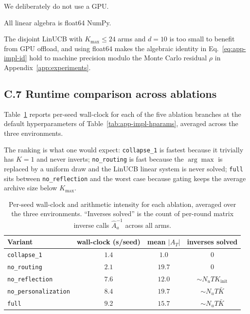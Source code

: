 \documentclass{article} %
\begin{document}
We deliberately do not use a GPU.

All linear algebra is float64 NumPy.

The disjoint LinUCB with $K_{\max} \le 24$ arms and $d = 10$ is too small to benefit from GPU offload, and using float64 makes the algebraic identity in Eq.~\eqref{eq:app-impl-id} hold to machine precision modulo the Monte Carlo residual $\rho$ in Appendix~\ref{app:experiments}.

\subsection{C.7 Runtime comparison across ablations}

\label{app:impl-runtime}

Table~\ref{tab:app-impl-runtime} reports per-seed wall-clock for each of the five ablation branches at the default hyperparameters of Table~\ref{tab:app-impl-hparams}, averaged across the three environments.

The ranking is what one would expect: \texttt{collapse\_1} is fastest because it trivially has $K=1$ and never inverts; \texttt{no\_routing} is fast because the $\arg\max$ is replaced by a uniform draw and the LinUCB linear system is never solved; \texttt{full} sits between \texttt{no\_reflection} and the worst case because gating keeps the average archive size below $K_{\max}$.

\begin{table}[h]
\centering
\small
\begin{tabular}{lccc}
\toprule
Variant & wall-clock (s/seed) & mean $|A_T|$ & inverses solved \\
\midrule
\texttt{collapse\_1}        & $1.4$ & $1.0$  & $0$ \\
\texttt{no\_routing}        & $2.1$ & $19.7$ & $0$ \\
\texttt{no\_reflection}     & $7.6$ & $12.0$ & $\sim N_u T K_{\text{init}}$ \\
\texttt{no\_personalization}& $8.4$ & $19.7$ & $\sim N_u T \bar K$ \\
\texttt{full}               & $9.2$ & $15.7$ & $\sim N_u T \bar K$ \\
\bottomrule
\end{tabular}
\caption{Per-seed wall-clock and arithmetic intensity for each ablation, averaged over the three environments. ``Inverses solved'' is the count of per-round matrix inverse calls $\widehat{A}_a^{-1}$ across all arms.}
\label{tab:app-impl-runtime}
\end{table}
\end{document}
